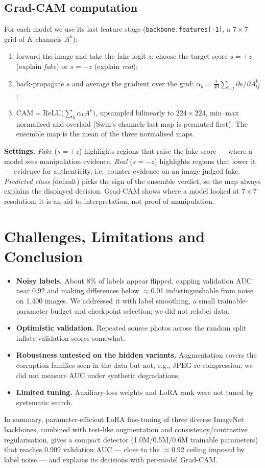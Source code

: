\documentclass[11pt,a4paper]{article}
\begin{document}
\subsection{Grad-CAM computation}
For each model we use its last feature stage (\texttt{backbone.features[-1]}, a $7\times7$ grid of $K$ channels $A^k$):
\begin{enumerate}
\item forward the image and take the fake logit $z$; choose the target score $s=+z$ (explain \emph{fake}) or $s=-z$ (explain \emph{real});
\item back-propagate $s$ and average the gradient over the grid: $\alpha_k = \frac{1}{49}\sum_{i,j}\partial s/\partial A^k_{ij}$;
\item $\mathrm{CAM} = \mathrm{ReLU}\big(\sum_k \alpha_k A^k\big)$, upsampled bilinearly to $224\times224$, min--max normalised and overlaid (Swin's channels-last map is permuted first). The ensemble map is the mean of the three normalised maps.
\end{enumerate}
\textbf{Settings.} \emph{Fake} ($s=+z$) highlights regions that raise the fake score --- where a model sees manipulation evidence. \emph{Real} ($s=-z$) highlights regions that lower it --- evidence for authenticity, i.e.\ counter-evidence on an image judged fake. \emph{Predicted class} (default) picks the sign of the ensemble verdict, so the map always explains the displayed decision. Grad-CAM shows where a model looked at $7\times7$ resolution; it is an aid to interpretation, not proof of manipulation.

\section{Challenges, Limitations and Conclusion}
\begin{itemize}
\item \textbf{Noisy labels.} About 8\% of labels appear flipped, capping validation AUC near 0.92 and making differences below $\approx$0.01 indistinguishable from noise on 1{,}400 images. We addressed it with label smoothing, a small trainable-parameter budget and checkpoint selection; we did not relabel data.
\item \textbf{Optimistic validation.} Repeated source photos across the random split inflate validation scores somewhat.
\item \textbf{Robustness untested on the hidden variants.} Augmentation covers the corruption families seen in the data but not, e.g., JPEG re-compression; we did not measure AUC under synthetic degradations.
\item \textbf{Limited tuning.} Auxiliary-loss weights and LoRA rank were not tuned by systematic search.
\end{itemize}
\noindent In summary, parameter-efficient LoRA fine-tuning of three diverse ImageNet backbones, combined with test-like augmentation and consistency/contrastive regularisation, gives a compact detector (1.0M/0.5M/0.6M trainable parameters) that reaches 0.909 validation AUC --- close to the $\approx$0.92 ceiling imposed by label noise --- and explains its decisions with per-model Grad-CAM.
\end{document}
